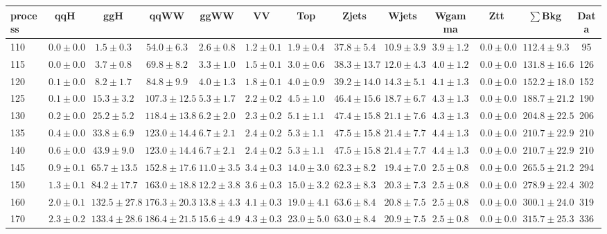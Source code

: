 \begin{table}
{%
 \tiny
 \begin{center}
 \begin{tabular}{l | c c | c c c c c c c c  | c c}
 \hline
 process & qqH & ggH & qqWW & ggWW & VV & Top & Zjets & Wjets & Wgamma & Ztt & $\sum$Bkg & Data \\
 \hline
110 & $0.0\pm0.0$ & $1.5\pm0.3$ & $54.0\pm6.3$ & $2.6\pm0.8$ & $1.2\pm0.1$ & $1.9\pm0.4$ & $37.8\pm5.4$ & $10.9\pm3.9$ & $3.9\pm1.2$ & $0.0\pm0.0$ & $112.4\pm9.3$ & 95 \\
115 & $0.0\pm0.0$ & $3.7\pm0.8$ & $69.8\pm8.2$ & $3.3\pm1.0$ & $1.5\pm0.1$ & $3.0\pm0.6$ & $38.3\pm13.7$ & $12.0\pm4.3$ & $4.0\pm1.2$ & $0.0\pm0.0$ & $131.8\pm16.6$ & 126 \\
120 & $0.1\pm0.0$ & $8.2\pm1.7$ & $84.8\pm9.9$ & $4.0\pm1.3$ & $1.8\pm0.1$ & $4.0\pm0.9$ & $39.2\pm14.0$ & $14.3\pm5.1$ & $4.1\pm1.3$ & $0.0\pm0.0$ & $152.2\pm18.0$ & 152 \\
125 & $0.1\pm0.0$ & $15.3\pm3.2$ & $107.3\pm12.5$ & $5.3\pm1.7$ & $2.2\pm0.2$ & $4.5\pm1.0$ & $46.4\pm15.6$ & $18.7\pm6.7$ & $4.3\pm1.3$ & $0.0\pm0.0$ & $188.7\pm21.2$ & 190 \\
130 & $0.2\pm0.0$ & $25.2\pm5.2$ & $118.4\pm13.8$ & $6.2\pm2.0$ & $2.3\pm0.2$ & $5.1\pm1.1$ & $47.4\pm15.8$ & $21.1\pm7.6$ & $4.3\pm1.3$ & $0.0\pm0.0$ & $204.8\pm22.5$ & 206 \\
135 & $0.4\pm0.0$ & $33.8\pm6.9$ & $123.0\pm14.4$ & $6.7\pm2.1$ & $2.4\pm0.2$ & $5.3\pm1.1$ & $47.5\pm15.8$ & $21.4\pm7.7$ & $4.4\pm1.3$ & $0.0\pm0.0$ & $210.7\pm22.9$ & 210 \\
140 & $0.6\pm0.0$ & $43.9\pm9.0$ & $123.0\pm14.4$ & $6.7\pm2.1$ & $2.4\pm0.2$ & $5.3\pm1.1$ & $47.5\pm15.8$ & $21.4\pm7.7$ & $4.4\pm1.3$ & $0.0\pm0.0$ & $210.7\pm22.9$ & 210 \\
145 & $0.9\pm0.1$ & $65.7\pm13.5$ & $152.8\pm17.6$ & $11.0\pm3.5$ & $3.4\pm0.3$ & $14.0\pm3.0$ & $62.3\pm8.2$ & $19.4\pm7.0$ & $2.5\pm0.8$ & $0.0\pm0.0$ & $265.5\pm21.2$ & 294 \\
150 & $1.3\pm0.1$ & $84.2\pm17.7$ & $163.0\pm18.8$ & $12.2\pm3.8$ & $3.6\pm0.3$ & $15.0\pm3.2$ & $62.3\pm8.3$ & $20.3\pm7.3$ & $2.5\pm0.8$ & $0.0\pm0.0$ & $278.9\pm22.4$ & 302 \\
160 & $2.0\pm0.1$ & $132.5\pm27.8$ & $176.3\pm20.3$ & $13.8\pm4.3$ & $4.1\pm0.3$ & $19.0\pm4.1$ & $63.6\pm8.4$ & $20.8\pm7.5$ & $2.5\pm0.8$ & $0.0\pm0.0$ & $300.1\pm24.0$ & 319 \\
170 & $2.3\pm0.2$ & $133.4\pm28.6$ & $186.4\pm21.5$ & $15.6\pm4.9$ & $4.3\pm0.3$ & $23.0\pm5.0$ & $63.0\pm8.4$ & $20.9\pm7.5$ & $2.5\pm0.8$ & $0.0\pm0.0$ & $315.7\pm25.3$ & 336 \\

\end{tabular}
\end{center}}
\end{table}
